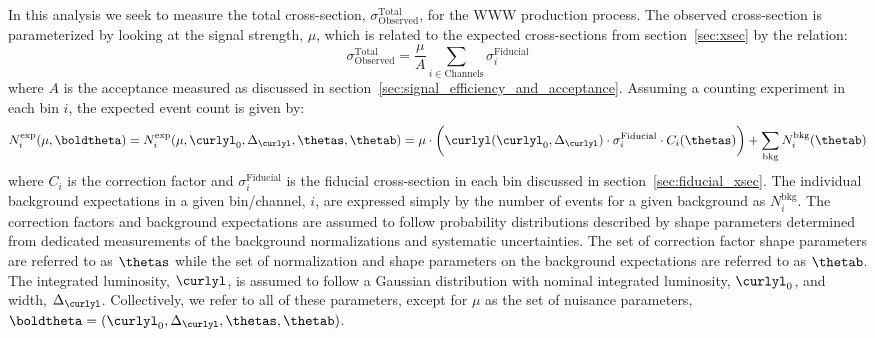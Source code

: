 
In this analysis we seek to measure the total cross-section, $\sigma^{\textrm{Total}}_{\textrm{Observed}}$, for the WWW production process.
The observed cross-section is parameterized by looking at the signal
strength, $\mu$, which is related to the expected cross-sections
from section~\ref{sec:xsec} by the relation:
\begin{equation}
\sigma^{\textrm{Total}}_{\textrm{Observed}} = \frac{\mu}{A} \sum_{i\in \textrm{Channels}} \sigma^{\textrm{Fiducial}}_i
\label{eq:sigmatot}
\end{equation}
where $A$ is the acceptance
measured as discussed in section~\ref{sec:signal_efficiency_and_acceptance}.
Assuming a counting experiment in each bin $i$, the expected event count is given by:
\begin{equation}
N^{\mathrm{exp}}_i(\mu,\boldtheta) = N^{\mathrm{exp}}_i(\mu,\curlyl_0,\Delta_{\curlyl},\thetas,\thetab) = \mu \cdot \bigg( \curlyl(\curlyl_0,\Delta_{\curlyl}) \cdot \sigma^{\mathrm{Fiducial}}_i \cdot C_i(\thetas) \bigg) + \sum_{\mathrm{bkg}} N_{i}^{\mathrm{bkg}}(\thetab)
\label{eq:poisson_expectation}
\end{equation}
where $C_i$ is the correction factor
and $\sigma^{\mathrm{Fiducial}}_i$ is the fiducial cross-section in each 
bin discussed in section~\ref{sec:fiducial_xsec}. The 
individual background expectations in a given bin/channel, $i$, are expressed simply by the number of events
for a given background as $N^{\mathrm{bkg}}_i$. 
The correction factors and background expectations are assumed to follow probability distributions described by shape parameters determined from dedicated measurements of the background normalizations and systematic uncertainties.  
The set of correction factor shape parameters are referred to as $\thetas$ while the set of normalization and shape parameters on the background expectations are referred to as $\thetab$.
The integrated luminosity, $\curlyl$, is assumed to follow 
a Gaussian distribution with nominal integrated luminosity, $\curlyl_0$, and width, $\Delta_{\curlyl}$. 
Collectively, we refer to all of these parameters, except for $\mu$ as the set of nuisance parameters, $\boldtheta = (\curlyl_0,\Delta_{\curlyl}, \thetas, \thetab)$. 

